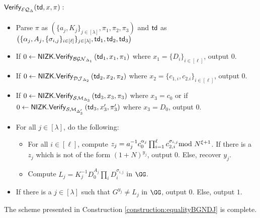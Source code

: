 \begin{construction}
\paragraph{$\mathsf{Verify}_{\mathcal{EQ}_{\Delta}}(\mathsf{td},x,\pi):$}
\begin{itemize}
\item Parse $\pi$ as $\left(\{a_j,K_j\}_{j\in [\lambda]},\pi_1,\pi_2,\pi_3\right)$ and $\mathsf{td}$ as $\left(\{\alpha_j,A_j,\{\sigma_{i,j}\}_{{i}\in[\ell]}\}_{j\in[\lambda]},\mathsf{td}_1,\mathsf{td}_2,\mathsf{td}_3\right)$
\item If $0\leftarrow\mathsf{NIZK.Verify}_{\mathcal{BGN}_{\Delta_1}}\left(\mathsf{td}_1, x_1,\pi_1\right)$ where $ x_1=\{D_i\}_{i\in[\ell]}$, output $0$.
\item If $0\leftarrow\mathsf{NIZK.Verify}_{\mathcal{DJ}_{\Delta_2}}\left(\mathsf{td}_2, x_2,\pi_2\right)$ where $ x_2=\{c_{1,i},c_{2.i}\}_{i\in[\ell]}$, output $0$.
  \item If $0\leftarrow\mathsf{NIZK.Verify}_{\mathcal{SM}_{\Delta_3}}\left(\mathsf{td}_3, x_3,\pi_3\right)$ where $ x_3=c_0$ or if $0\leftarrow\mathsf{NIZK.Verify}_{\mathcal{SM}_{\Delta_3'}}\left(\mathsf{td}_3, x_3',\pi_3'\right)$ where $ x_3=D_0$, output $0$.


\item For all $j\in [\lambda]$, do the following:
\begin{itemize}
    \item For all $i\in[\ell]$, compute $z_{j}=a_{j}^{-1}c_0^{\alpha_j}\prod_{i=1}^\ell c_{2,i}^{\sigma_{i,j}}\!\!\!\!\mod N^{\xi+1}$. If there is a $z_{j}$ which is not of the form $(1+N)^{y_{j}}$, output $0$. Else, recover $y_{j}$. 
\item Compute $L_j=K_j^{-1}D_0^{A_j} \prod_i D_i^{\sigma_{i,j}}$ in $\GG$.
\end{itemize}
\item If there is a $j\in [\lambda]$ such that $G^{y_j}\neq L_j$ in $\GG$, output $0$. Else, output $1$. 
\end{itemize}
\end{construction}




\begin{lemma}
The scheme presented in Construction \ref{construction:equalityBGNDJ} is complete.
\end{lemma}

